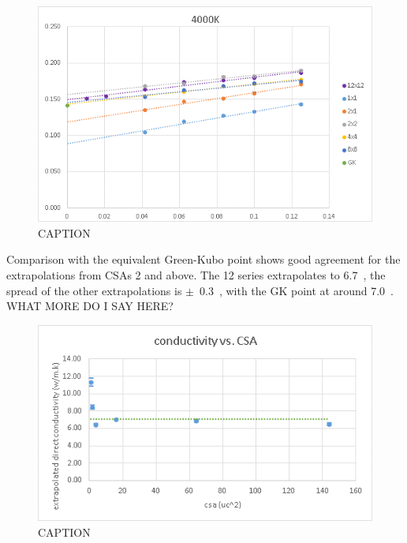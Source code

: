 \begin{figure}[h!]
\includegraphics[width=\linewidth]{Figures/direct_inv_cut-up_4000.png}
\caption[direct inv cut up 4000]{CAPTION}
\label{fig:direct_inv_cut-up_4000}
\end{figure}

\pagebreak

Comparison with the equivalent Green-Kubo point shows good agreement for the extrapolations from CSAs 2 and above. The 12 series extrapolates to 6.7~\wmk, the spread of the other extrapolations is $\pm$~0.3~\wmk, with the GK point at around 7.0~\wmk. WHAT MORE DO I SAY HERE?

\begin{figure}[h!]
\includegraphics[width=\linewidth]{Figures/direct_extrap_gk_comp_4000.png}
\caption[direct extrap gk comp 4000]{CAPTION}
\label{fig:direct_extrap_gk_comp_4000}
\end{figure}

\pagebreak

